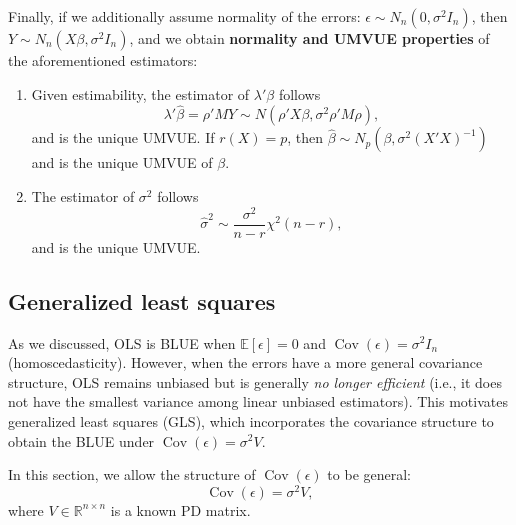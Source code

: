 \documentclass{article}
\theoremstyle{break}
\newcommand{\R}{\ensuremath{\mathbb{R}}}
\newcommand{\E}{\ensuremath{\mathbb{E}}}
\DeclareMathOperator{\Cov}{Cov}
\begin{document}
Finally, if we additionally assume normality of the errors: $\epsilon \sim N_n(0, \sigma^2 I_n)$, then $Y \sim N_n(X\beta, \sigma^2 I_n)$, and we obtain \textbf{normality and UMVUE properties} of the aforementioned estimators:
\begin{enumerate}
    \item Given estimability, the estimator of $\lambda'\beta$ follows 
    \[
    \lambda'\hat\beta = \rho'MY \sim N(\rho'X\beta, \sigma^2 \rho'M\rho),
    \]
    and is the unique UMVUE. 
    If $r(X)=p$, then $\hat\beta \sim N_p(\beta, \sigma^2 (X'X)^{-1})$ and is the unique UMVUE of $\beta$.
    \item The estimator of $\sigma^2$ follows 
    \[
    \hat\sigma^2 \sim \frac{\sigma^2}{n-r}\chi^2(n-r),
    \] 
    and is the unique UMVUE.
\end{enumerate}

\subsection{Generalized least squares}\label{sec:lm-gls}
As we discussed, OLS is BLUE when $\E[\epsilon]=0$ and $\Cov(\epsilon)=\sigma^2 I_n$ (homoscedasticity). However, when the errors have a more general covariance structure, OLS remains unbiased but is generally \emph{no longer efficient} (i.e., it does not have the smallest variance among linear unbiased estimators). This motivates generalized least squares (GLS), which incorporates the covariance structure to obtain the BLUE under $\Cov(\epsilon)=\sigma^2V$.

In this section, we allow the structure of $\Cov(\epsilon)$ to be general:
\[
    \Cov(\epsilon) = \sigma^2 V,
\]
where $V \in \R^{n \times n}$ is a known PD matrix. 
\end{document}
